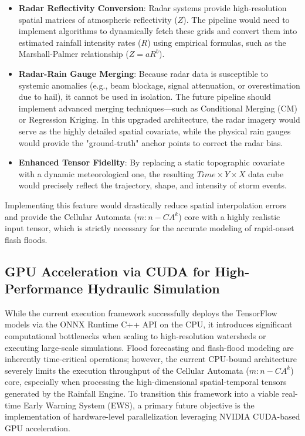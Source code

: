 \begin{itemize}
	\item \textbf{Radar Reflectivity Conversion}: Radar systems provide high-resolution spatial matrices of atmospheric 
	reflectivity ($Z$). The pipeline would need to implement algorithms to dynamically fetch these grids and convert 
	them into estimated rainfall intensity rates ($R$) using empirical formulas, such as the Marshall-Palmer relationship 
	($Z = aR^b$).
	\item \textbf{Radar-Rain Gauge Merging}: Because radar data is susceptible to systemic anomalies (e.g., beam blockage, 
	signal attenuation, or overestimation due to hail), it cannot be used in isolation. The future pipeline should 
	implement advanced merging techniques—such as Conditional Merging (CM) or Regression Kriging. In this upgraded 
	architecture, the radar imagery would serve as the highly detailed spatial covariate, while the physical rain gauges 
	would provide the "ground-truth" anchor points to correct the radar bias.
	\item \textbf{Enhanced Tensor Fidelity}: By replacing a static topographic covariate with a dynamic meteorological 
	one, the resulting $Time \times Y \times X$ data cube would precisely reflect the trajectory, shape, and intensity 
	of storm events.
\end{itemize}

Implementing this feature would drastically reduce spatial interpolation errors and provide the Cellular Automata 
($m:n-CA^k$) core with a highly realistic input tensor, which is strictly necessary for the accurate modeling of 
rapid-onset flash floods.


\subsection{GPU Acceleration via CUDA for High-Performance Hydraulic Simulation}

While the current execution framework successfully deploys the TensorFlow models via the ONNX Runtime C++ API on the 
CPU, it introduces significant computational bottlenecks when scaling to high-resolution watersheds or executing large-scale 
simulations. Flood forecasting and flash-flood modeling are inherently time-critical operations; however, the current 
CPU-bound architecture severely limits the execution throughput of the Cellular Automata ($m:n-CA^k$) core, especially when 
processing the high-dimensional spatial-temporal tensors generated by the Rainfall Engine. To transition this framework into a 
viable real-time Early Warning System (EWS), a primary future objective is the implementation of hardware-level parallelization 
leveraging NVIDIA CUDA-based GPU acceleration.

